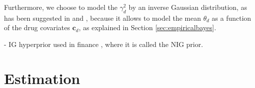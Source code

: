 \documentclass[a4paper,hidelinks]{article}\usepackage[]{graphicx}\usepackage[]{color}
\newcommand{\Vm}{\mathbf{V}}
\newcommand{\0}{\bm{0}}
\renewcommand{\(}{\left(}
\renewcommand{\)}{\right)}
\renewcommand{\[}{\left[}
\renewcommand{\]}{\right]}
\begin{document}
	Furthermore, we choose to model the $\gamma^2_d$ by an inverse Gaussian distribution, as has been suggested in \cite{fabrizi_specification_2016} and \cite{caron_sparse_2008}, because it allows to model the mean $\theta_d$ as a function of the drug covariates $\mathbf{c}_d$, as explained in Section \ref{sec:empiricalbayes}. 
	
	- IG hyperprior used in finance \cite[]{barndorff-nielsen_normal_1997}, where it is called the NIG prior.

	
	\section{Estimation}
\end{document}

